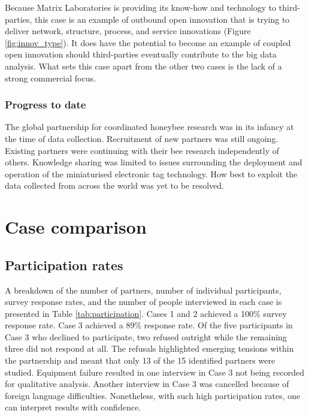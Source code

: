 Because Matrix Laboratories is providing its know-how and technology to third-parties, this case is an example of outbound open innovation that is trying to deliver network, structure, process, and service innovations (Figure \ref{fig:innov_type}). It does have the potential to become an example of coupled open innovation should third-parties eventually contribute to the big data analysis. What sets this case apart from the other two cases is the lack of a strong commercial focus. 

\subsubsection{Progress to date}

The global partnership for coordinated honeybee research was in its infancy at the time of data collection. Recruitment of new partners was still ongoing. Existing partners were continuing with their bee research independently of others. Knowledge sharing was limited to issues surrounding the deployment and operation of the miniaturised electronic tag technology. How best to exploit the data collected from across the world was yet to be resolved.  

\section{Case comparison}

\subsection{Participation rates}

A breakdown of the number of partners, number of individual participants, survey response rates, and the number of people interviewed in each case is presented in Table \ref{tab:participation}. Cases 1 and 2 achieved a 100\% survey response rate. Case 3 achieved a 89\% response rate. Of the five participants in Case 3 who declined to participate, two refused outright while the remaining three did not respond at all. The refusals highlighted emerging tensions within the partnership and meant that only 13 of the 15 identified partners were studied. Equipment failure resulted in one interview in Case 3 not being recorded for qualitative analysis. Another interview in Case 3 was cancelled because of foreign language difficulties. Nonetheless, with such high participation rates, one can interpret results with confidence. \medskip

